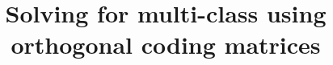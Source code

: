 %
%
%
%
%
%
\RequirePackage{fix-cm}
%
\documentclass[smallextended]{svjour3}       %
%
\smartqed  %
%
\usepackage{graphicx}
\usepackage{amsmath}
\usepackage{url}
\usepackage{xcolor}

\newenvironment{eqnnon}{\begin{equation*}}{\end{equation*}}
\newenvironment{eqnarraynon}{\begin{eqnarray*}}{\end{eqnarray*}}

\newcommand{\citep}[1]{\cite{#1}}
\newcommand{\citet}[1]{\cite{#1}}

%
%
%
%
%


\title{Solving for multi-class using orthogonal coding matrices}


